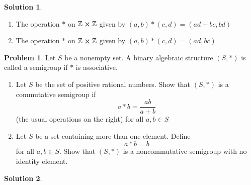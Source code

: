 \documentclass[10pt]{article}
\theoremstyle{definition}
\newtheorem{problem}{Problem}
\newtheorem{soln}{Solution}
\newcommand{\justif}[2]{&{#1}&\text{#2}}
\begin{document}
\begin{soln}
\begin{enumerate}[label=(\alph*)]
\begin{proof}
\begin{align*}
              a*(b*c) & = a*(b+2bc)                                                       \\
                      & = a+ 2a(b+2bc)                                                    \\
                      & = a+ 2ab+4abc\justif{\quad}{$\cdot$ distributive on $\mathbb{Z}$}
            \end{align*}
            and
            \begin{align*}
              (a*b)*c & = (a+2ab)*c                                                        \\
                      & = c+ 2c(a+2ab)                                                     \\
                      & = c+ 2ca+4cab \justif{\quad}{$\cdot$ distributive on $\mathbb{Z}$} \\
            \end{align*}
            which cannot be manipulated to be equal, therefore $*$ is not associative here. \qedhere
          \end{proof}
    \item The operation $*$ on $\mathbb{Z}\cross\mathbb{Z}$ given by $(a,b)*(c,d)=(ad+bc, bd)$
    \item The operation $*$ on $\mathbb{Z}\cross\mathbb{Z}$ given by $(a,b)*(c,d)=(ad,bc)$
  \end{enumerate}
\end{soln}

\begin{problem}
Let $S$ be a nonempty set. A binary algebraic structure $(S, *)$ is called
a semigroup if $*$ is associative.
\begin{enumerate}[label=(\alph*)]
  \item Let $S$ be the set of positive rational numbers. Show that $(S, *)$
        is a commutative semigroup if
        $$a*b=\frac{ab}{a+b}$$
        (the usual operations on the right) for all $a,b\in S$
  \item Let $S$ be a set containing more than one element. Define
        $$a*b=b$$
        for all $a,b\in S$. Show that $(S,*)$ is a noncommutative semigroup with no identity element.
\end{enumerate}
\end{problem}
\begin{soln}
\end{soln}
\end{document}
